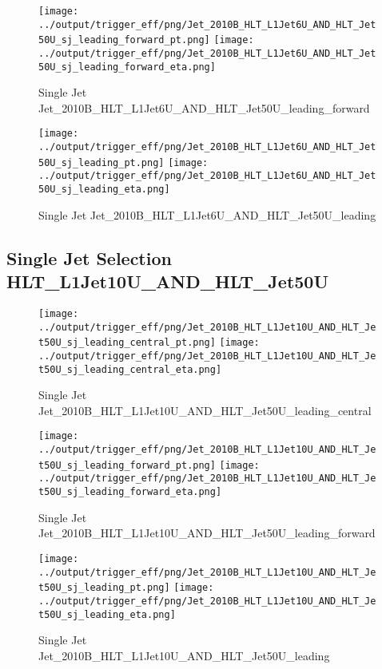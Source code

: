 \documentclass[11pt]{article}
\begin{document}
\begin{figure}[ht]
\centering
\texttt{[image: ../output/trigger\_eff/png/Jet\_2010B\_HLT\_L1Jet6U\_AND\_HLT\_Jet50U\_sj\_leading\_forward\_pt.png]}
\texttt{[image: ../output/trigger\_eff/png/Jet\_2010B\_HLT\_L1Jet6U\_AND\_HLT\_Jet50U\_sj\_leading\_forward\_eta.png]}
\caption{Single Jet Jet\_2010B\_HLT\_L1Jet6U\_AND\_HLT\_Jet50U\_leading\_forward}
\label{fig:jet_sj_L1Jet6U_AND_HLT_Jet50U_leading_forward}
\end{figure}

\begin{figure}[ht]
\centering
\texttt{[image: ../output/trigger\_eff/png/Jet\_2010B\_HLT\_L1Jet6U\_AND\_HLT\_Jet50U\_sj\_leading\_pt.png]}
\texttt{[image: ../output/trigger\_eff/png/Jet\_2010B\_HLT\_L1Jet6U\_AND\_HLT\_Jet50U\_sj\_leading\_eta.png]}
\caption{Single Jet Jet\_2010B\_HLT\_L1Jet6U\_AND\_HLT\_Jet50U\_leading}
\label{fig:jet_sj_L1Jet6U_AND_HLT_Jet50U_leading}
\end{figure}


\newpage
\subsection{Single Jet Selection HLT\_L1Jet10U\_AND\_HLT\_Jet50U}
\begin{figure}[ht]
\centering
\texttt{[image: ../output/trigger\_eff/png/Jet\_2010B\_HLT\_L1Jet10U\_AND\_HLT\_Jet50U\_sj\_leading\_central\_pt.png]}
\texttt{[image: ../output/trigger\_eff/png/Jet\_2010B\_HLT\_L1Jet10U\_AND\_HLT\_Jet50U\_sj\_leading\_central\_eta.png]}
\caption{Single Jet Jet\_2010B\_HLT\_L1Jet10U\_AND\_HLT\_Jet50U\_leading\_central}
\label{fig:jet_sj_L1Jet10U_AND_HLT_Jet50U_leading_central}
\end{figure}

\begin{figure}[ht]
\centering
\texttt{[image: ../output/trigger\_eff/png/Jet\_2010B\_HLT\_L1Jet10U\_AND\_HLT\_Jet50U\_sj\_leading\_forward\_pt.png]}
\texttt{[image: ../output/trigger\_eff/png/Jet\_2010B\_HLT\_L1Jet10U\_AND\_HLT\_Jet50U\_sj\_leading\_forward\_eta.png]}
\caption{Single Jet Jet\_2010B\_HLT\_L1Jet10U\_AND\_HLT\_Jet50U\_leading\_forward}
\label{fig:jet_sj_L1Jet10U_AND_HLT_Jet50U_leading_forward}
\end{figure}

\begin{figure}[ht]
\centering
\texttt{[image: ../output/trigger\_eff/png/Jet\_2010B\_HLT\_L1Jet10U\_AND\_HLT\_Jet50U\_sj\_leading\_pt.png]}
\texttt{[image: ../output/trigger\_eff/png/Jet\_2010B\_HLT\_L1Jet10U\_AND\_HLT\_Jet50U\_sj\_leading\_eta.png]}
\caption{Single Jet Jet\_2010B\_HLT\_L1Jet10U\_AND\_HLT\_Jet50U\_leading}
\label{fig:jet_sj_L1Jet10U_AND_HLT_Jet50U_leading}
\end{figure}
\end{document}
